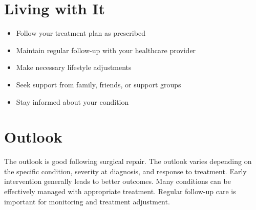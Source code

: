 \section{Living with It}
\begin{itemize}[noitemsep]
  \item Follow your treatment plan as prescribed
  \item Maintain regular follow-up with your healthcare provider
  \item Make necessary lifestyle adjustments
  \item Seek support from family, friends, or support groups
  \item Stay informed about your condition
\end{itemize}
\section{Outlook}
The outlook is good following surgical repair. The outlook varies depending on the specific condition, severity at diagnosis, and response to treatment. Early intervention generally leads to better outcomes. Many conditions can be effectively managed with appropriate treatment. Regular follow-up care is important for monitoring and treatment adjustment.
